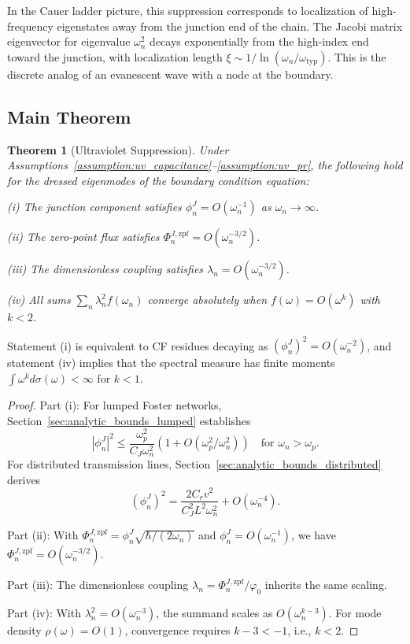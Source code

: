 \documentclass[reprint, floatfix, superscriptaddress, amsmath, amssymb, longbibliography]{revtex4-2}
\newtheorem{theorem}{Theorem}[section]
\begin{document}
In the Cauer ladder picture, this suppression corresponds to localization of high-frequency eigenstates away from the junction end of the chain. The Jacobi matrix eigenvector for eigenvalue $\omega_n^2$ decays exponentially from the high-index end toward the junction, with localization length $\xi \sim 1/\ln(\omega_n/\omega_{\mathrm{typ}})$. This is the discrete analog of an evanescent wave with a node at the boundary.

\subsection{Main Theorem}
\label{sec:main_theorem}

\begin{theorem}[Ultraviolet Suppression]
\label{thm:uv_main}
Under Assumptions~\ref{assumption:uv_capacitance}--\ref{assumption:uv_pr}, the following hold for the dressed eigenmodes of the boundary condition equation:

\textup{(i)} The junction component satisfies $\phi_n^J = O(\omega_n^{-1})$ as $\omega_n \to \infty$.

\textup{(ii)} The zero-point flux satisfies $\Phi_n^{J,\mathrm{zpf}} = O(\omega_n^{-3/2})$.

\textup{(iii)} The dimensionless coupling satisfies $\lambda_n = O(\omega_n^{-3/2})$.

\textup{(iv)} All sums $\sum_n \lambda_n^2 f(\omega_n)$ converge absolutely when $f(\omega) = O(\omega^k)$ with $k < 2$.
\end{theorem}

Statement (i) is equivalent to CF residues decaying as $(\phi_n^J)^2 = O(\omega_n^{-2})$, and statement (iv) implies that the spectral measure has finite moments $\int \omega^k d\sigma(\omega) < \infty$ for $k < 1$.

\begin{proof}
Part (i): For lumped Foster networks, Section~\ref{sec:analytic_bounds_lumped} establishes
\begin{equation}
|\phi_n^J|^2 \leq \frac{\omega_p^2}{C_J \omega_n^2}\left(1 + O(\omega_p^2/\omega_n^2)\right) \quad \text{for } \omega_n > \omega_p.
\end{equation}
For distributed transmission lines, Section~\ref{sec:analytic_bounds_distributed} derives
\begin{equation}
(\phi_n^J)^2 = \frac{2 C_r v^2}{C_J^2 L^2 \omega_n^2} + O(\omega_n^{-4}).
\end{equation}

Part (ii): With $\Phi_n^{J,\mathrm{zpf}} = \phi_n^J\sqrt{\hbar/(2\omega_n)}$ and $\phi_n^J = O(\omega_n^{-1})$, we have $\Phi_n^{J,\mathrm{zpf}} = O(\omega_n^{-3/2})$.

Part (iii): The dimensionless coupling $\lambda_n = \Phi_n^{J,\mathrm{zpf}}/\varphi_0$ inherits the same scaling.

Part (iv): With $\lambda_n^2 = O(\omega_n^{-3})$, the summand scales as $O(\omega_n^{k-3})$. For mode density $\rho(\omega) = O(1)$, convergence requires $k - 3 < -1$, i.e., $k < 2$.
\end{proof}
\end{document}
